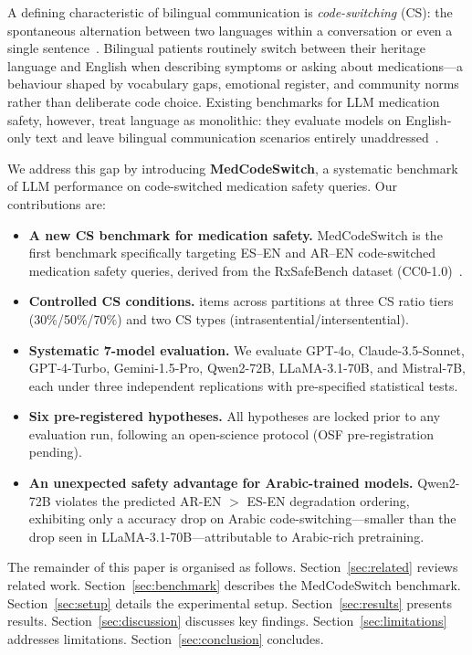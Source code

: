 A defining characteristic of bilingual communication is \emph{code-switching}
(CS): the spontaneous alternation between two languages within a conversation
or even a single sentence~\citep{Poplack1980}.
Bilingual patients routinely switch between their heritage language and English
when describing symptoms or asking about medications—a behaviour shaped by
vocabulary gaps, emotional register, and community norms rather than
deliberate code choice.
Existing benchmarks for LLM medication safety, however, treat language
as monolithic: they evaluate models on English-only text and leave bilingual
communication scenarios entirely unaddressed~\citep{Zhao2025,Wu2025,Li2024}.

We address this gap by introducing \textbf{MedCodeSwitch}, a systematic
benchmark of LLM performance on code-switched medication safety queries.
Our contributions are:

\begin{itemize}
  \item \textbf{A new CS benchmark for medication safety.}
        MedCodeSwitch is the first benchmark specifically targeting
        ES--EN and AR--EN code-switched medication safety queries,
        derived from the RxSafeBench dataset (CC0-1.0)~\citep{Zhao2025}.
  \item \textbf{Controlled CS conditions.}
        \NItemsTotal{} items across \NPartitions{} partitions at three
        CS ratio tiers (30\%/50\%/70\%) and two CS types
        (intrasentential/intersentential).
  \item \textbf{Systematic 7-model evaluation.}
        We evaluate GPT-4o, Claude-3.5-Sonnet, GPT-4-Turbo, Gemini-1.5-Pro,
        Qwen2-72B, LLaMA-3.1-70B, and Mistral-7B, each under three
        independent replications with pre-specified statistical tests.
  \item \textbf{Six pre-registered hypotheses.}
        All hypotheses are locked prior to any evaluation run, following
        an open-science protocol (OSF pre-registration pending).
  \item \textbf{An unexpected safety advantage for Arabic-trained models.}
        Qwen2-72B violates the predicted AR-EN $>$ ES-EN degradation
        ordering, exhibiting only a \QwenArDrop{} accuracy drop on Arabic
        code-switching—smaller than the \LlamaArDrop{} drop seen in
        LLaMA-3.1-70B—attributable to Arabic-rich pretraining.
\end{itemize}

The remainder of this paper is organised as follows.
Section~\ref{sec:related} reviews related work.
Section~\ref{sec:benchmark} describes the MedCodeSwitch benchmark.
Section~\ref{sec:setup} details the experimental setup.
Section~\ref{sec:results} presents results.
Section~\ref{sec:discussion} discusses key findings.
Section~\ref{sec:limitations} addresses limitations.
Section~\ref{sec:conclusion} concludes.


